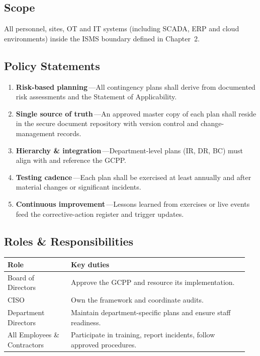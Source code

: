 \subsection*{Scope}
All personnel, sites, OT and IT systems (including SCADA, ERP and cloud
environments) inside the ISMS boundary defined in Chapter~2.

\subsection*{Policy Statements}
\begin{enumerate}[label=\arabic*.]
  \item \textbf{Risk-based planning}\,—All contingency plans shall derive
        from documented risk assessments and the Statement of Applicability.
  \item \textbf{Single source of truth}\,—An approved master copy of each
        plan shall reside in the secure document repository with version
        control and change-management records.
  \item \textbf{Hierarchy \& integration}\,—Department-level plans (IR, DR,
        BC) must align with and reference the \ac{GCPP}.
  \item \textbf{Testing cadence}\,—Each plan shall be exercised at least
        annually and after material changes or significant incidents.
  \item \textbf{Continuous improvement}\,—Lessons learned from exercises or
        live events feed the corrective-action register and trigger updates.
\end{enumerate}

\subsection*{Roles \& Responsibilities}

\begin{longtable}{@{}p{0.25\linewidth}p{0.7\linewidth}@{}}
\toprule
\textbf{Role} & \textbf{Key duties}\\
\midrule
\endhead
Board of Directors & Approve the \ac{GCPP} and resource its implementation.\\[2pt]
\ac{CISO} & Own the framework and coordinate
audits.\\[2pt]
Department Directors & Maintain department-specific plans and ensure staff
readiness.\\[2pt]
All Employees \& Contractors & Participate in training, report incidents,
follow approved procedures.\\
\bottomrule
\end{longtable}

